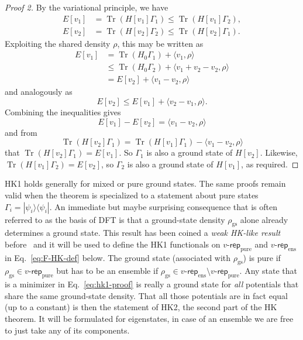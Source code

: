 \documentclass[journal=apcach,manuscript=article,layout=twocolumn]{achemso}
\newcommand{\rhogs}{{\rho_\mathrm{gs}}}
\newcommand{\vrep}{\ensuremath{v\text{-}\mathsf{rep}}}
\newcommand{\vreppure}{\ensuremath{\vrep_\mathrm{pure}}}
\newcommand{\vrepens}{\ensuremath{\vrep_\mathrm{ens}}}
\DeclareMathOperator{\trace}{Tr}
\newcommand{\changed}[1] {{ {#1}}} %
\begin{document}
\begin{proof}[Proof 2]
By the variational principle, we have
\begin{equation*}
\begin{aligned}
    E[v_1] &= \trace( H[v_1] \Gamma_1) \leq \trace( H[v_1] \Gamma_2), \\
    E[v_2] &= \trace( H[v_2] \Gamma_2) \leq \trace( H[v_2] \Gamma_1).
\end{aligned}
\end{equation*}
Exploiting the shared density $\rho$, this may be written as
 \begin{equation*}
  \begin{split}
   E[v_1] & = \trace( H_0 \Gamma_1) + \langle v_1, \rho \rangle \\
   &\leq \trace( H_0 \Gamma_2) + \langle v_1 + v_2-v_2, \rho \rangle\\
   & = E[v_2] + \langle  v_1-v_2, \rho \rangle
   \end{split}
 \end{equation*}
and analogously as
 \begin{equation*}
   E[v_2] \leq E[v_1] + \langle  v_2-v_1, \rho \rangle.
 \end{equation*}
Combining the inequalities gives 
\[E[v_1] - E[v_2] = \langle  v_1-v_2, \rho \rangle
\]
and from 
\[
\trace( H[v_2] \Gamma_1) = \trace( H[v_1] \Gamma_1) - \langle  v_1-v_2, \rho \rangle
\]
that $\trace( H[v_2] \Gamma_1)=E[v_1]$. So $\Gamma_1$ is also a ground state of $H[v_2]$. Likewise, $\trace( H[v_1] \Gamma_2)=E[v_2]$, so $\Gamma_2$ is also a ground state of $H[v_1]$, as required.
\end{proof}

HK1 holds generally for mixed or pure ground states. The same proofs remain valid when the theorem is specialized to a statement about pure states $\Gamma_i = |\psi_i\rangle \langle \psi_i|$.
An immediate but maybe surprising consequence that is often referred to as the basis of DFT is that a ground-state density $\rhogs$ alone already determines a ground state. This result has been coined a \changed{\emph{weak HK-like result}} before~\cite{Tellgren2018} and it will be used to define the HK1 functionals on $\vreppure$ and $\vrepens$ in Eq.~\eqref{eq:F-HK-def} below. The ground state (\changed{associated} with $\rhogs$) is pure if $\rhogs \in \vreppure$ but has to be an ensemble if $\rhogs \in \vrepens \setminus \vreppure$.
Any state that is a minimizer in Eq.~\eqref{eq:hk1-proof} is really a ground state for \emph{all} potentials that share the same ground-state density. That all those potentials are in fact equal (up to a constant) is then the statement of HK2, the second part of the \changed{HK} theorem.
It will be formulated for eigenstates, in case of an ensemble we are free to just take any of its components.
\end{document}
